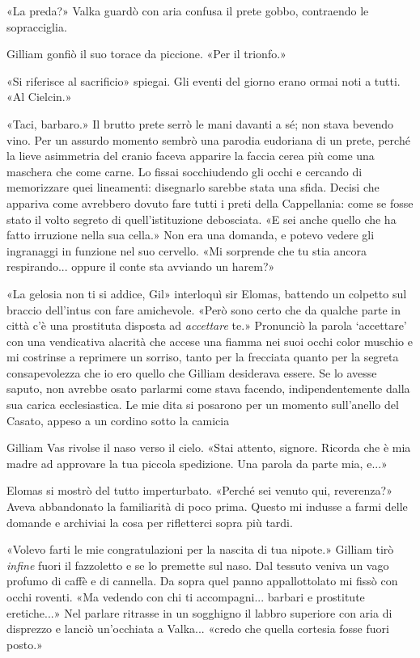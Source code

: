 «La preda?» Valka guardò con aria confusa il prete gobbo, contraendo le
sopracciglia.

Gilliam gonfiò il suo torace da piccione. «Per il trionfo.»

«Si riferisce al sacrificio» spiegai. Gli eventi del giorno erano ormai
noti a tutti. «Al Cielcin.»

«Taci, barbaro.» Il brutto prete serrò le mani davanti a sé; non stava
bevendo vino. Per un assurdo momento sembrò una parodia eudoriana di un
prete, perché la lieve asimmetria del cranio faceva apparire la faccia
cerea più come una maschera che come carne. Lo fissai socchiudendo gli
occhi e cercando di memorizzare quei lineamenti: disegnarlo sarebbe
stata una sfida. Decisi che appariva come avrebbero dovuto fare tutti i
preti della Cappellania: come se fosse stato il volto segreto di
quell'istituzione debosciata. «E sei anche quello che ha fatto irruzione
nella sua cella.» Non era una domanda, e potevo vedere gli ingranaggi in
funzione nel suo cervello. «Mi sorprende che tu stia ancora
respirando... oppure il conte sta avviando un harem?»

«La gelosia non ti si addice, Gil» interloquì sir Elomas, battendo un
colpetto sul braccio dell'intus con fare amichevole. «Però sono certo
che da qualche parte in città c'è una prostituta disposta ad
\emph{accettare} te.» Pronunciò la parola `accettare' con una
vendicativa alacrità che accese una fiamma nei suoi occhi color muschio
e mi costrinse a reprimere un sorriso, tanto per la frecciata quanto per
la segreta consapevolezza che io ero quello che Gilliam desiderava
essere. Se lo avesse saputo, non avrebbe osato parlarmi come stava
facendo, indipendentemente dalla sua carica ecclesiastica. Le mie dita
si posarono per un momento sull'anello del Casato, appeso a un cordino
sotto la camicia

Gilliam Vas rivolse il naso verso il cielo. «Stai attento, signore.
Ricorda che è mia madre ad approvare la tua piccola spedizione. Una
parola da parte mia, e...»

Elomas si mostrò del tutto imperturbato. «Perché sei venuto qui,
reverenza?» Aveva abbandonato la familiarità di poco prima. Questo mi
indusse a farmi delle domande e archiviai la cosa per rifletterci sopra
più tardi.

«Volevo farti le mie congratulazioni per la nascita di tua nipote.»
Gilliam tirò \emph{infine} fuori il fazzoletto e se lo premette sul
naso. Dal tessuto veniva un vago profumo di caffè e di cannella. Da
sopra quel panno appallottolato mi fissò con occhi roventi. «Ma vedendo
con chi ti accompagni... barbari e prostitute eretiche...» Nel parlare
ritrasse in un sogghigno il labbro superiore con aria di disprezzo e
lanciò un'occhiata a Valka... «credo che quella cortesia fosse fuori
posto.»

